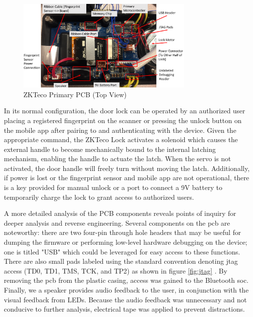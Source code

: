 \documentclass[conference]{IEEEtran}
\begin{document}
\begin{figure}[ht]
  \includegraphics[width=8.7cm]{images/MainPCB(Labeled).png}
  \caption{ZKTeco Primary PCB (Top View)}
  \label{fig:pcb1}
\end{figure}

\bigskip 

In its normal configuration, the door lock can be operated by an authorized user placing a registered fingerprint on the scanner or pressing the unlock button on the mobile app after pairing to and authenticating with the device. Given the appropriate command, the ZKTeco Lock activates a solenoid which causes the external handle to become mechanically bound to the internal latching mechanism, enabling the handle to actuate the latch. When the servo is not activated, the door handle will freely turn without moving the latch. Additionally, if power is lost or the fingerprint sensor and mobile app are not operational, there is a key provided for manual unlock or a port to connect a 9V battery to temporarily charge the lock to grant access to authorized users.

\bigskip 

A more detailed analysis of the PCB components reveals points of inquiry for deeper analysis and reverse engineering. Several components on the \gls{pcb} are noteworthy: there are two four-pin through hole headers that may be useful for dumping the firmware or performing low-level hardware debugging on the device; one is titled "USB" which could be leveraged for easy access to these functions. There are also small pads labeled using the standard convention denoting \gls{jtag} access (TD0, TD1, TMS, TCK, and TP2) as shown in figure \ref{fig:jtag} \cite{IEEE2013}. By removing the \gls{pcb} from the plastic casing, access was gained to the Bluetooth \gls{soc}. Finally, we a speaker provides audio feedback to the user, in conjunction with the visual feedback from LEDs.  Because the audio feedback was unnecessary and not conducive to further analysis, electrical tape was applied to prevent distractions.
\end{document}
